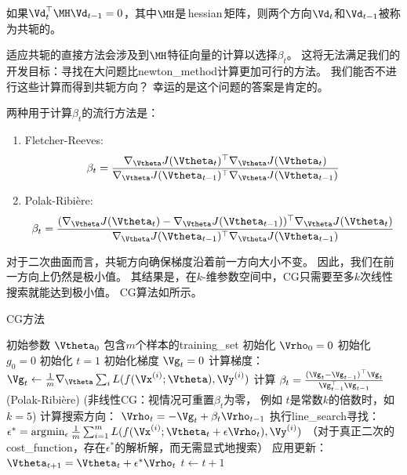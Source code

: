 
如果$\Vd_t^\top \MH \Vd_{t-1} = 0$，其中$\MH$是\,\gls{hessian}\,矩阵，则两个方向$\Vd_t$和$\Vd_{t-1}$被称为共轭的。

适应共轭的直接方法会涉及到$\MH$特征向量的计算以选择$\beta_t$。
这将无法满足我们的开发目标：寻找在大问题比\gls{newton_method}计算更加可行的方法。
我们能否不进行这些计算而得到共轭方向？
幸运的是这个问题的答案是肯定的。

两种用于计算$\beta_t$的流行方法是：
\begin{enumerate}
\item Fletcher-Reeves:
\begin{equation}
    \beta_t = \frac{ \nabla_{\Vtheta} J(\Vtheta_t)^\top \nabla_{\Vtheta} J(\Vtheta_t) }
{ \nabla_{\Vtheta} J(\Vtheta_{t-1})^\top \nabla_{\Vtheta} J(\Vtheta_{t-1}) }
\end{equation}

\item Polak-Ribi\`{e}re:
\begin{equation}
    \beta_t = \frac{ (\nabla_{\Vtheta} J(\Vtheta_t) - \nabla_{\Vtheta} J(\Vtheta_{t-1}))^\top \nabla_{\Vtheta} J(\Vtheta_t) }
{ \nabla_{\Vtheta} J(\Vtheta_{t-1})^\top \nabla_{\Vtheta} J(\Vtheta_{t-1}) }
\end{equation}
\end{enumerate}
对于二次曲面而言，共轭方向确保梯度沿着前一方向大小不变。
因此，我们在前一方向上仍然是极小值。
其结果是，在$k$-维参数空间中，\gls{CG}只需要至多$k$次线性搜索就能达到极小值。
\gls{CG}算法如所示。

\begin{algorithm}[ht]
\caption{\gls{CG}方法}
\label{alg:cg}
\begin{algorithmic}
\REQUIRE 初始参数 $\Vtheta_{0}$
\REQUIRE 包含$m$个样本的\gls{training_set}
\STATE 初始化 $\Vrho_{0} = 0$
\STATE 初始化 $g_0 = 0$
\STATE 初始化 $t = 1$
    \STATE 初始化梯度 ${\Vg}_{t} = 0$
    \STATE 计算梯度：$\Vg_{t} \leftarrow
         \frac{1}{m}\nabla_{\Vtheta} \sum_i L(f(\Vx^{(i)};\Vtheta),\Vy^{(i)})$ 
    \STATE 计算 $\beta_{t} = \frac{(\Vg_{t}-\Vg_{t-1})^\top \Vg_{t}}{\Vg_{t-1}^\top \Vg_{t-1}}$  (Polak-Ribi\`{e}re)
    \STATE (非线性\gls{CG}：视情况可重置$\beta_{t}$为零，
           例如  $t$是常数$k$的倍数时，如 $k=5$)
    \STATE 计算搜索方向： $\Vrho_{t} = -\Vg_{t} + \beta_{t} \Vrho_{t-1}$ 
    \STATE 执行\gls{line_search}寻找：$\epsilon^{*} = \arg\!\min_{\epsilon}
    \frac{1}{m} \sum_{i=1}^{m}L(f(\Vx^{(i)};\Vtheta_t + \epsilon \Vrho_t),\Vy^{(i)})$ 
    \STATE （对于真正二次的\gls{cost_function}，存在$\epsilon^*$的解析解，而无需显式地搜索）
    \STATE 应用更新：$\Vtheta_{t+1} = \Vtheta_{t}+ \epsilon^{*} \Vrho_{t}$
    \STATE $t \leftarrow t + 1$
\ENDWHILE
\end{algorithmic}
\end{algorithm}


